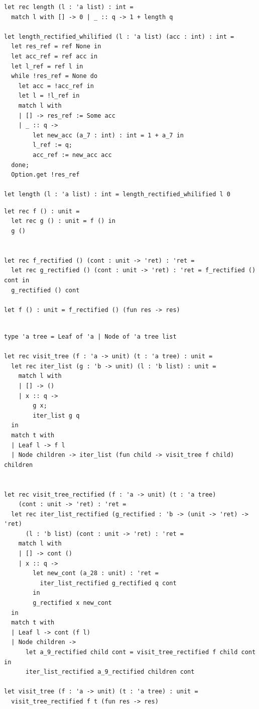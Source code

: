 \begin{verbatim}
let rec length (l : 'a list) : int =
  match l with [] -> 0 | _ :: q -> 1 + length q

let length_rectified_whilified (l : 'a list) (acc : int) : int =
  let res_ref = ref None in
  let acc_ref = ref acc in
  let l_ref = ref l in
  while !res_ref = None do
    let acc = !acc_ref in
    let l = !l_ref in
    match l with
    | [] -> res_ref := Some acc
    | _ :: q ->
        let new_acc (a_7 : int) : int = 1 + a_7 in
        l_ref := q;
        acc_ref := new_acc acc
  done;
  Option.get !res_ref

let length (l : 'a list) : int = length_rectified_whilified l 0
\end{verbatim}

\begin{verbatim}
let rec f () : unit =
  let rec g () : unit = f () in
  g ()


let rec f_rectified () (cont : unit -> 'ret) : 'ret =
  let rec g_rectified () (cont : unit -> 'ret) : 'ret = f_rectified () cont in
  g_rectified () cont

let f () : unit = f_rectified () (fun res -> res)
\end{verbatim}

\begin{verbatim}

type 'a tree = Leaf of 'a | Node of 'a tree list

let rec visit_tree (f : 'a -> unit) (t : 'a tree) : unit =
  let rec iter_list (g : 'b -> unit) (l : 'b list) : unit =
    match l with
    | [] -> ()
    | x :: q ->
        g x;
        iter_list g q
  in
  match t with
  | Leaf l -> f l
  | Node children -> iter_list (fun child -> visit_tree f child) children


let rec visit_tree_rectified (f : 'a -> unit) (t : 'a tree)
    (cont : unit -> 'ret) : 'ret =
  let rec iter_list_rectified (g_rectified : 'b -> (unit -> 'ret) -> 'ret)
      (l : 'b list) (cont : unit -> 'ret) : 'ret =
    match l with
    | [] -> cont ()
    | x :: q ->
        let new_cont (a_28 : unit) : 'ret =
          iter_list_rectified g_rectified q cont
        in
        g_rectified x new_cont
  in
  match t with
  | Leaf l -> cont (f l)
  | Node children ->
      let a_9_rectified child cont = visit_tree_rectified f child cont in
      iter_list_rectified a_9_rectified children cont

let visit_tree (f : 'a -> unit) (t : 'a tree) : unit =
  visit_tree_rectified f t (fun res -> res)
\end{verbatim}

